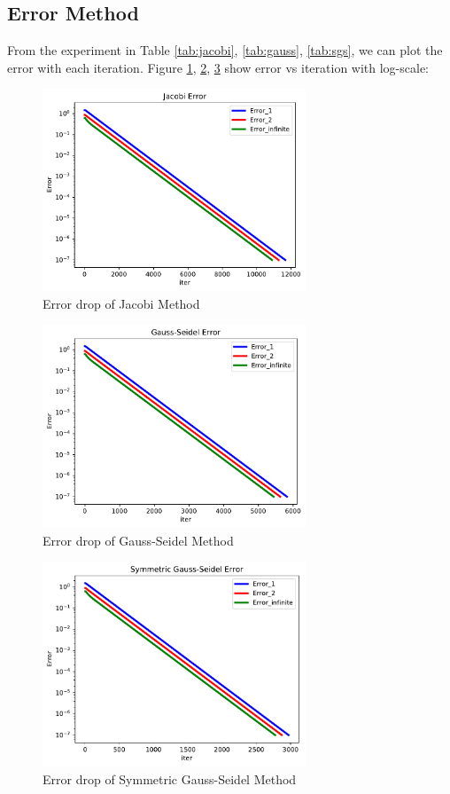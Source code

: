 \documentclass{article}
\begin{document}
\subsection{Error Method}
\label{sec:error}
From the experiment in Table \ref{tab:jacobi}, \ref{tab:gauss}, \ref{tab:sgs}, we can plot the error with each iteration. 
Figure \ref{fig:jacobi_error}, \ref{fig:gauss_error}, \ref{fig:sgs_error} show error vs iteration with log-scale:
\begin{figure}[H]
    \centering
    \includegraphics[width=0.7\textwidth]{src/jacobi_error.pdf}
    \caption{Error drop of Jacobi Method}
    \label{fig:jacobi_error}
\end{figure}
\begin{figure}[H]
    \centering
    \includegraphics[width=0.7\textwidth]{src/gauss_error.pdf}
    \caption{Error drop of Gauss-Seidel Method}
    \label{fig:gauss_error}
\end{figure}
\begin{figure}[H]
    \centering
    \includegraphics[width=0.7\textwidth]{src/sgs_error.pdf}
    \caption{Error drop of Symmetric Gauss-Seidel Method}
    \label{fig:sgs_error}
\end{figure}
\end{document}
